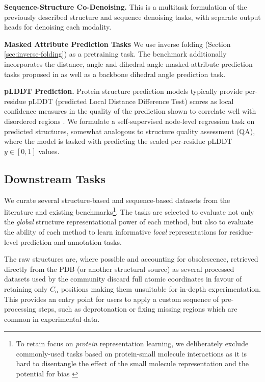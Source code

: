 \textbf{Sequence-Structure Co-Denoising. } This is a multitask formulation of the previously described structure and sequence denoising tasks, with separate output heads for denoising each modality.

\textbf{Masked Attribute Prediction Tasks} 
We use inverse folding (Section \ref{sec:inverse-folding}) as a pretraining task.
The benchmark additionally incorporates the distance, angle and dihedral angle masked-attribute prediction tasks proposed in \citet{zhang2023protein} as well as a backbone dihedral angle prediction task.

\textbf{pLDDT Prediction. } Protein structure prediction models typically provide per-residue pLDDT (predicted Local Distance Difference Test) scores as local confidence measures in the quality of the prediction shown to correlate well with disordered regions \citep{wilson2022alphafold2}. We formulate a self-supervised node-level regression task on predicted structures, somewhat analogous to structure quality assessment (QA), where the model is tasked with predicting the scaled per-residue pLDDT $y \in [0, 1]$ values.


\subsection{Downstream Tasks}
We curate several structure-based and sequence-based datasets from the literature and existing benchmarks\footnote{To retain focus on \emph{protein} representation learning, we deliberately exclude commonly-used tasks based on protein-small molecule interactions as it is hard to disentangle the effect of the small molecule representation and the potential for bias \citep{Boyles2019}}. The tasks are selected to evaluate not only the \emph{global} structure representational power of each method, but also to evaluate the ability of each method to learn informative \emph{local} representations for residue-level prediction and annotation tasks.

The raw structures are, where possible and accounting for obsolescence, retrieved directly from the PDB (or another structural source) as several processed datasets used by the community discard full atomic coordinates in favour of retaining only $C_\alpha$ positions making them unsuitable for in-depth experimentation. This provides an entry point for users to apply a custom sequence of pre-processing steps, such as deprotonation or fixing missing regions which are common in experimental data.

